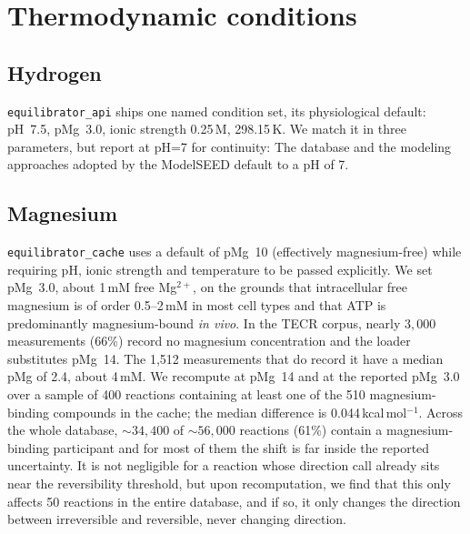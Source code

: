 \section{Thermodynamic conditions}\label{sec:s2}

\subsection{Hydrogen} \texttt{equilibrator\_api} ships one named condition set, its physiological default: pH~7.5, pMg~3.0, ionic strength 0.25\,M, 298.15\,K. We match it in three parameters, but report at pH=7 for continuity: The database and the modeling approaches adopted by the ModelSEED default to a pH of 7.

\subsection{Magnesium} \texttt{equilibrator\_cache} uses a default of pMg~10 (effectively magnesium-free) while requiring pH, ionic strength and temperature to be passed explicitly. We set pMg~3.0, about 1\,mM free Mg$^{2+}$, on the grounds that intracellular free magnesium is of order 0.5--2\,mM in most cell types and that ATP is predominantly magnesium-bound \emph{in vivo}. In the TECR corpus, nearly $3,000$ measurements (66\%) record no magnesium concentration and the loader substitutes pMg~14. The 1,512 measurements that do record it have a median pMg of 2.4, about 4\,mM. We recompute \drGo{} at pMg~14 and at the reported pMg~3.0 over a sample of 400 reactions containing at least one of the 510 magnesium-binding compounds in the cache; the median difference is 0.044\,kcal\,mol$^{-1}$. Across the whole database, $\sim34,400$ of $\sim56,000$ reactions (61\%) contain a magnesium-binding participant and for most of them the shift is far inside the reported uncertainty. It is not negligible for a reaction whose direction call already sits near the reversibility threshold, but upon recomputation, we find that this only affects 50 reactions in the entire database, and if so, it only changes the direction between irreversible and reversible, never changing direction.